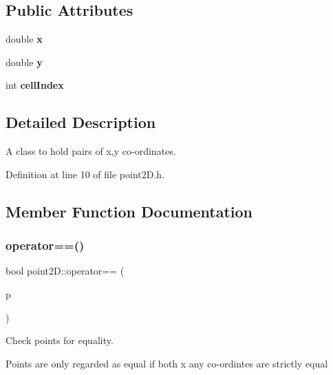 \subsection*{Public Attributes}
\begin{DoxyCompactItemize}
\item 
\mbox{\label{classpoint2D_ade69032d2a9596dfd5c2b3ee29551569}} 
double {\bfseries x}
\item 
\mbox{\label{classpoint2D_aeb2d0d7a7919611c9b6022fec6ca0bc6}} 
double {\bfseries y}
\item 
\mbox{\label{classpoint2D_ac6fadd42bce37bf8d54665b350246768}} 
int {\bfseries cell\+Index}
\end{DoxyCompactItemize}


\subsection{Detailed Description}
A class to hold pairs of x,y co-\/ordinates. 

Definition at line 10 of file point2\+D.\+h.



\subsection{Member Function Documentation}
\mbox{\label{classpoint2D_a34b676d196277da05f03e87dc2f88288}} 
\subsubsection{\texorpdfstring{operator==()}{operator==()}}
{\footnotesize\ttfamily bool point2\+D\+::operator== (\begin{DoxyParamCaption}\item[{const \mbox{\hyperlink{classpoint2D}{point2D}} \&}]{p }\end{DoxyParamCaption})\hspace{0.3cm}{\ttfamily [inline]}}



Check points for equality. 

Points are only regarded as equal if both x any co-\/ordintes are strictly equal


